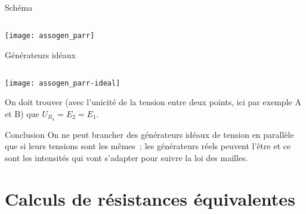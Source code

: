 \documentclass[a4paper, 12pt, final, garamond]{book}
\begin{document}
\begin{tcbraster}[raster columns=5, raster equal height=rows]
    \begin{NCdefi}[raster multicolumn=2]{Schéma}
        \subsection{}
        \vspace*{-12pt}
        \begin{center}
            \texttt{[image: assogen\_parr]}
        \end{center}
    \end{NCdefi}
    \begin{NCexem}[raster multicolumn=3]{Générateurs idéaux}
        \subsection{}\vspace*{-20pt}
        \begin{center}
            \texttt{[image: assogen\_parr-ideal]}
        \end{center}
        On doit trouver (avec l'unicité de la tension entre deux points, ici par
        exemple A et B) que $U_{R_4} = E_2 = E_1$.
    \end{NCexem}
\end{tcbraster}
\begin{center}
    \begin{NCprop}[width=.7\linewidth]{Conclusion}
        On ne peut brancher des générateurs idéaux de tension en parallèle que
        si leurs tensions sont les mêmes~; les générateurs réels peuvent l'être
        et ce sont les intensités qui vont s'adapter pour suivre la loi des
        mailles.
    \end{NCprop}
\end{center}

\section{Calculs de résistances équivalentes}
\end{document}
